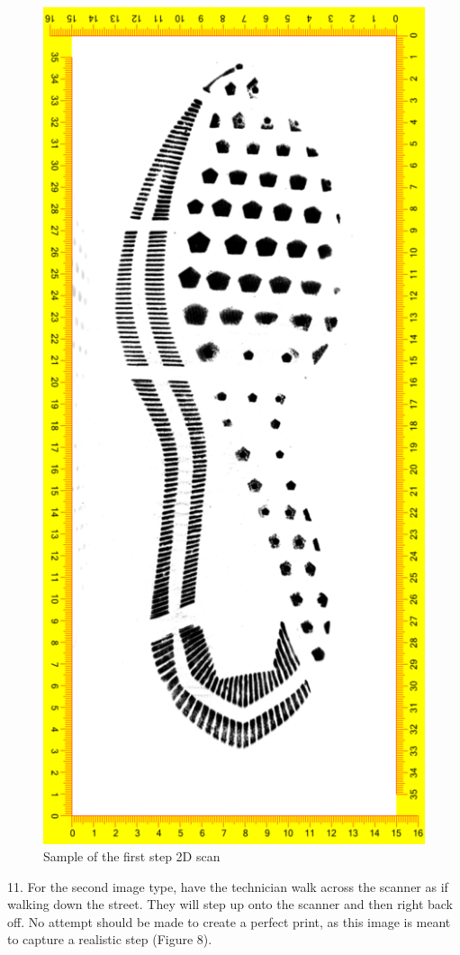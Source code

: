 \begin{figure}[!htp]
\centering
\includegraphics[scale=.9]{2D_1}
\caption{Sample of the first step 2D scan}
\label{Image 7}
\end{figure}

\newpage

11. For the second image type, have the technician walk across the scanner as if walking down the street. They will step up onto the scanner and then right back off. No attempt should be made to create a perfect print, as this image is meant to capture a realistic step (Figure 8). 

